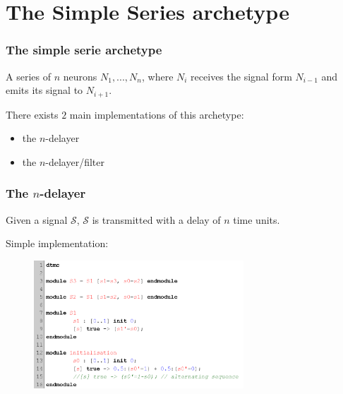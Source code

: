 \section{The Simple Series archetype}
\begin{frame}
  \frametitle{The simple serie archetype}

  \begin{definition}
    A series of $n$ neurons $N_1, ..., N_n$, where $N_i$ receives the signal form $N_{i-1}$ and emits its signal to $N_{i+1}$.
  \end{definition}

  \mysep{}

  There exists $2$ main implementations of this archetype:
  \begin{itemize}
    \item the $n$-delayer
    \item the $n$-delayer/filter
  \end{itemize}

\end{frame}

\begin{frame}[fragile]
  \frametitle{The $n$-delayer}

  Given a signal $\mathcal{S}$, $\mathcal{S}$ is transmitted with a delay of $n$ time units.

  \mysep{}

  Simple implementation:

  \begin{figure}
    \includegraphics[width=0.7\textwidth]{pic/simple_serie1_code.png}
  \end{figure}

\end{frame}

